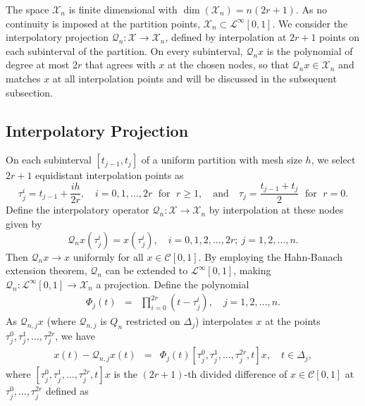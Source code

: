 \documentclass[]{interact}
\theoremstyle{plain}%
\theoremstyle{definition}
\theoremstyle{remark}
\begin{document}
\noindent
The space $\mathcal{X}_n$ is finite dimensional with $\dim(\mathcal{X}_n) = n(2r+1)$. 
As no continuity is imposed at the partition points, $\mathcal{X}_n \subset \mathcal{L}^\infty[0,1]$.
We consider the interpolatory projection $\mathcal{Q}_n: \mathcal{X} \to \mathcal{X}_n$, 
defined by interpolation at $2r+1$ points on each subinterval of the partition. On every subinterval, $\mathcal{Q}_nx$ is the polynomial of degree at most $2r$ that agrees with $x$ at the chosen nodes, so that $\mathcal{Q}_nx \in \mathcal{X}_n$ and matches $x$ at all interpolation points and will be discussed in the subsequent subsection.


\subsection{Interpolatory Projection}
On each subinterval $[t_{j-1}, t_j]$ of a uniform partition with mesh size $h$, we select $2r+1$ equidistant interpolation points as 
\begin{equation*}
	\tau_j^i = t_{j-1} + \frac{ih}{2r}, \quad i = 0, 1, \ldots, 2r  \; \text{ for } \; r \geq 1, \quad \text{and} \quad \tau_j = \frac{t_{j-1} + t_j}{2} \; \text{ for }  \; r = 0.
\end{equation*}
Define the interpolatory operator $\mathcal{Q}_n : \mathcal{X} \to \mathcal{X}_n$ by interpolation at these nodes given by
\begin{equation} \label{Eq:04}
	\mathcal{Q}_nx(\tau_j^i) = x(\tau_j^i), \quad i = 0, 1, 2, \ldots, 2r; ~ j = 1, 2, \ldots, n.
\end{equation}
Then $\mathcal{Q}_n x \to x$ uniformly for all $x \in \mathcal{C}[0,1]$.  By employing the Hahn-Banach extension theorem, \(\mathcal{Q}_n\) can be extended to \(\mathcal{L}^\infty[0,1]\), making \(\mathcal{Q}_n : \mathcal{L}^\infty[0,1] \to \mathcal{X}_n\) a projection. Define the polynomial 
\begin{eqnarray*}
	\Phi_j(t) & = & \prod_{i=0}^{2r} \left(t - \tau_j^i \right), \quad j = 1, 2, \ldots, n.
\end{eqnarray*}
As \(\mathcal{Q}_{n,j}x\) (where \(\mathcal{Q}_{n,j}\) is \(Q_{n}\) restricted on \(\Delta_j\)) interpolates \(x\) at the points \(\tau_j^0, \tau_j^1, \ldots, \tau_j^{2r}\), we have
\begin{eqnarray*}
	x(t) - \mathcal{Q}_{n,j}x(t) & = & \Phi_j(t) \left[\tau_j^0, \tau_j^1, \ldots, \tau_j^{2r}, t\right]x, \quad t \in \Delta_j,
\end{eqnarray*}
where $\left[\tau_j^0, \tau_j^1, \ldots, \tau_j^{2r}, t\right]x$ is the $(2r+1)$-th divided difference of $x \in \mathcal{C}[0, 1]$ at $\tau_j^0, \ldots, \tau_j^{2r}$ defined as
\end{document}

